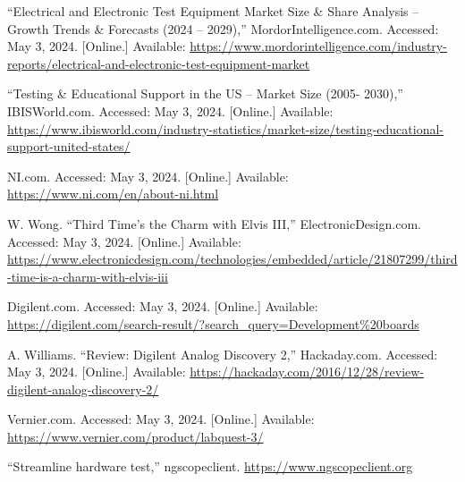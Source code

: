 \begin{thebibliography}{99}
	
	“Electrical and Electronic Test Equipment Market Size \& Share Analysis – Growth Trends \& Forecasts (2024 – 2029),” MordorIntelligence.com. Accessed: May 3, 2024. [Online.] Available: \url{https://www.mordorintelligence.com/industry-reports/electrical-and-electronic-test-equipment-market}
	
	“Testing \& Educational Support in the US – Market Size (2005- 2030),” IBISWorld.com. Accessed: May 3, 2024. [Online.] Available: \url{https://www.ibisworld.com/industry-statistics/market-size/testing-educational-support-united-states/}
	
	NI.com. Accessed: May 3, 2024. [Online.] Available: \url{https://www.ni.com/en/about-ni.html}
	
	W. Wong. “Third Time’s the Charm with Elvis III,” ElectronicDesign.com. Accessed: May 3, 2024. [Online.] Available: \url{https://www.electronicdesign.com/technologies/embedded/article/21807299/third-time-is-a-charm-with-elvis-iii}
	
	Digilent.com. Accessed: May 3, 2024. [Online.] Available: \url{https://digilent.com/search-result/?search_query=Development\%20boards}
	
	A. Williams. “Review: Digilent Analog Discovery 2,” Hackaday.com. Accessed: May 3, 2024. [Online.] Available: \url{https://hackaday.com/2016/12/28/review-digilent-analog-discovery-2/}
	
	Vernier.com. Accessed: May 3, 2024. [Online.] Available: \url{https://www.vernier.com/product/labquest-3/}
	
	“Streamline hardware test,” ngscopeclient.
	\url{https://www.ngscopeclient.org }
\end{thebibliography}
‌